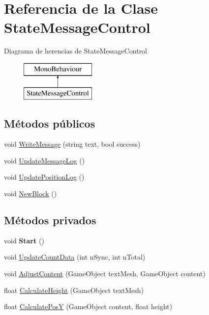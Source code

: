 \hypertarget{class_state_message_control}{}\section{Referencia de la Clase State\+Message\+Control}
\label{class_state_message_control}
Diagrama de herencias de State\+Message\+Control\begin{figure}[H]
\begin{center}
\leavevmode
\includegraphics[height=2.000000cm]{class_state_message_control}
\end{center}
\end{figure}
\subsection*{Métodos públicos}
\begin{DoxyCompactItemize}
\item 
void \mbox{\hyperlink{class_state_message_control_a0b0830fc3f8fe9d578fce4b3d944cde6}{Write\+Message}} (string text, bool success)
\item 
void \mbox{\hyperlink{class_state_message_control_af56933aa9a5a8d7d2c1e5fd515ec65e8}{Update\+Message\+Log}} ()
\item 
void \mbox{\hyperlink{class_state_message_control_aeace074591852cb0cc7125520bc49817}{Update\+Position\+Log}} ()
\item 
void \mbox{\hyperlink{class_state_message_control_a534610a9734b552696484aaeeb83c8b7}{New\+Block}} ()
\end{DoxyCompactItemize}
\subsection*{Métodos privados}
\begin{DoxyCompactItemize}
\item 
\mbox{\label{class_state_message_control_adf8e104a97efb32e6d4fc5ada6cdd57d}} 
void {\bfseries Start} ()
\item 
void \mbox{\hyperlink{class_state_message_control_a09f2f0b683668a6b87f01078626c1ee0}{Update\+Count\+Data}} (int n\+Sync, int n\+Total)
\item 
void \mbox{\hyperlink{class_state_message_control_a251349ec61d12eff0a0dbb4871991c94}{Adjust\+Content}} (Game\+Object text\+Mesh, Game\+Object content)
\item 
float \mbox{\hyperlink{class_state_message_control_a4ec35157d5b660616e1c8a7340d9f04d}{Calculate\+Height}} (Game\+Object text\+Mesh)
\item 
float \mbox{\hyperlink{class_state_message_control_a2f45459b571b7afcf4967d9bbca1f5b6}{Calculate\+PosY}} (Game\+Object content, float height)
\end{DoxyCompactItemize}
